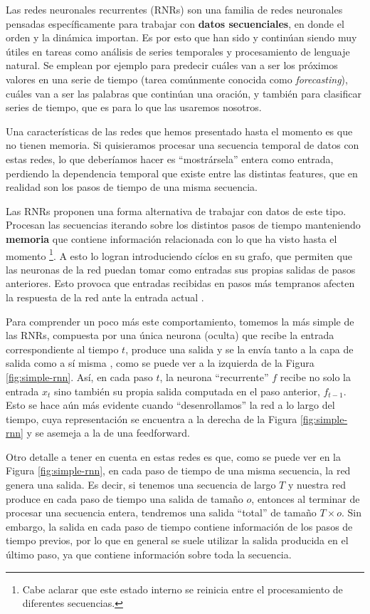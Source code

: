 \documentclass[../../main.tex]{subfiles}
\begin{document}
Las redes neuronales recurrentes (RNRs) son una familia de redes neuronales pensadas
específicamente para trabajar con \textbf{datos secuenciales}, en donde el orden y la
dinámica importan. Es por esto que han sido y continúan siendo muy útiles en tareas como
análisis de series temporales y procesamiento de lenguaje natural. Se emplean por ejemplo
para predecir cuáles van a ser los próximos valores en una serie de tiempo (tarea
comúnmente conocida como \textit{forecasting}), cuáles van a ser las palabras que
continúan una oración, y también para clasificar series de tiempo, que es para lo que las
usaremos nosotros.

Una características de las redes que hemos presentado hasta el momento es que no tienen
memoria. Si quisieramos procesar una secuencia temporal de datos con estas redes, lo que
deberíamos hacer es ``mostrársela'' entera como entrada, perdiendo la dependencia temporal
que existe entre las distintas features, que en realidad son los pasos de tiempo de una
misma secuencia.

Las RNRs proponen una forma alternativa de trabajar con datos de este tipo. Procesan las
secuencias iterando sobre los distintos pasos de tiempo manteniendo \textbf{memoria} que
contiene información relacionada con lo que ha visto hasta el momento \footnote{Cabe
aclarar que este estado interno se reinicia entre el procesamiento de diferentes
secuencias.}. A esto lo logran introduciendo cíclos en su grafo, que permiten que las
neuronas de la red puedan tomar como entradas sus propias salidas de pasos anteriores.
Esto provoca que entradas recibidas en pasos más tempranos afecten la respuesta de la red
ante la entrada actual \cite{ai-a-modern-approach}.

Para comprender un poco más este comportamiento, tomemos la más simple de las RNRs,
compuesta por una única neurona (oculta) que recibe la entrada correspondiente al tiempo
\(t\), produce una salida y se la envía tanto a la capa de salida como a sí misma
\cite{hands-on-ML-sklearn-tf}, como se puede ver a la izquierda de la Figura
\ref{fig:simple-rnn}. Así, en cada paso \(t\), la neurona ``recurrente'' \(f\)
recibe no solo la entrada \(x_t\) sino también su propia salida computada en el paso
anterior, \(f_{t-1}\). Esto se hace aún más evidente cuando ``desenrollamos'' la red a lo
largo del tiempo, cuya representación se encuentra a la derecha de la Figura
\ref{fig:simple-rnn} y se asemeja a la de una feedforward.

Otro detalle a tener en cuenta en estas redes es que, como se puede ver en la Figura
\ref{fig:simple-rnn}, en cada paso de tiempo de una misma secuencia, la red genera una
salida. Es decir, si tenemos una secuencia de largo \(T\) y nuestra red produce en cada
paso de tiempo una salida de tamaño \(o\), entonces al terminar de procesar una secuencia
entera, tendremos una salida ``total'' de tamaño \(T \times o\). Sin embargo,
la salida en cada paso de tiempo contiene información de los pasos de tiempo previos,
por lo que en general se suele utilizar la salida producida en el último paso, ya
que contiene información sobre toda la secuencia.
\end{document}
